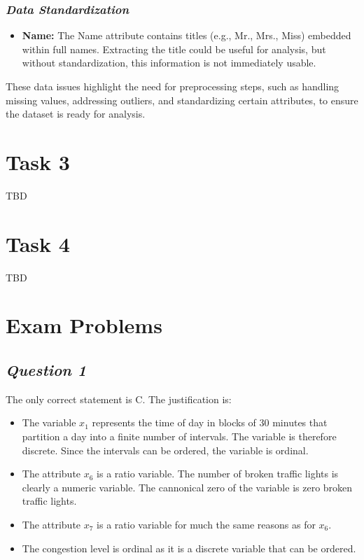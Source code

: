 \documentclass[twoside,11pt]{article}
\makeatletter
\let\@oldsection\section
\renewcommand\section[1]{\@oldsection*{#1}}
\let\@oldsubsection\subsection
\renewcommand\subsection[1]{\@oldsubsection*{\textit{#1}}}
\let\@oldsubsubsection\subsubsection
\renewcommand\subsubsection[1]{\@oldsubsubsection*{\textit{#1}}}
\makeatother
\begin{document}
\subsubsection{Data Standardization}
\begin{itemize}
    \item \textbf{Name:} The Name attribute contains titles (e.g., Mr., Mrs., Miss) embedded within full names. Extracting the title could be useful for analysis, but without standardization, this information is not immediately usable.
\end{itemize}

These data issues highlight the need for preprocessing steps, such as handling missing values, addressing outliers, and standardizing certain attributes, to ensure the dataset is ready for analysis.


\section{Task 3}


TBD


\section{Task 4}

TBD

\section{Exam Problems}

\subsection{Question 1}

The only correct statement is C. The justification is:

\begin{itemize}
\item
  The variable \(x_1\) represents the time of day in blocks of 30
  minutes that partition a day into a finite number of intervals. The
  variable is therefore discrete. Since the intervals can be ordered,
  the variable is ordinal.
\item
  The attribute \(x_6\) is a ratio variable. The number of broken
  traffic lights is clearly a numeric variable. The cannonical zero of
  the variable is zero broken traffic lights.
\item
  The attribute \(x_7\) is a ratio variable for much the same reasons as
  for \(x_6\).
\item
  The congestion level is ordinal as it is a discrete variable that can
  be ordered.
\end{itemize}
\end{document}
